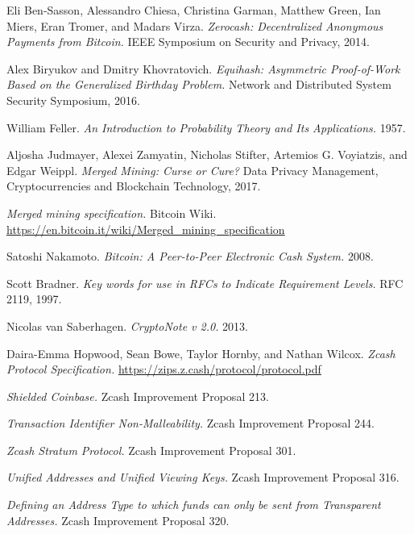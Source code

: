\documentclass[10pt,letterpaper]{article}
\theoremstyle{plain}
\begin{document}
\begin{description}[leftmargin=7.5em,style=nextline,labelwidth=7em,font=\normalfont]
\item[{[BCGGMTV2014]}] Eli Ben-Sasson, Alessandro Chiesa, Christina Garman, Matthew Green, Ian Miers, Eran Tromer, and Madars Virza. \emph{Zerocash: Decentralized Anonymous Payments from Bitcoin.} IEEE Symposium on Security and Privacy, 2014.
\item[{[BK2016]}] Alex Biryukov and Dmitry Khovratovich. \emph{Equihash: Asymmetric Proof-of-Work Based on the Generalized Birthday Problem.} Network and Distributed System Security Symposium, 2016.
\item[{[Feller1957]}] William Feller. \emph{An Introduction to Probability Theory and Its Applications.} 1957.
\item[{[JZSVW2017]}] Aljosha Judmayer, Alexei Zamyatin, Nicholas Stifter, Artemios G. Voyiatzis, and Edgar Weippl. \emph{Merged Mining: Curse or Cure?} Data Privacy Management, Cryptocurrencies and Blockchain Technology, 2017.
\item[{[MergedMining]}] \emph{Merged mining specification.} Bitcoin Wiki. \url{https://en.bitcoin.it/wiki/Merged_mining_specification}
\item[{[Nakamoto2008]}] Satoshi Nakamoto. \emph{Bitcoin: A Peer-to-Peer Electronic Cash System.} 2008.
\item[{[RFC-2119]}] Scott Bradner. \emph{Key words for use in RFCs to Indicate Requirement Levels.} RFC 2119, 1997.
\item[{[vanSaberh2013]}] Nicolas van Saberhagen. \emph{CryptoNote v 2.0.} 2013.
\item[{[Zcash-Protocol]}] Daira-Emma Hopwood, Sean Bowe, Taylor Hornby, and Nathan Wilcox. \emph{Zcash Protocol Specification.} \url{https://zips.z.cash/protocol/protocol.pdf}
\item[{[ZIP-213]}] \emph{Shielded Coinbase.} Zcash Improvement Proposal 213.
\item[{[ZIP-244]}] \emph{Transaction Identifier Non-Malleability.} Zcash Improvement Proposal 244.
\item[{[ZIP-301]}] \emph{Zcash Stratum Protocol.} Zcash Improvement Proposal 301.
\item[{[ZIP-316]}] \emph{Unified Addresses and Unified Viewing Keys.} Zcash Improvement Proposal 316.
\item[{[ZIP-320]}] \emph{Defining an Address Type to which funds can only be sent from Transparent Addresses.} Zcash Improvement Proposal 320.
\end{description}
\end{document}
